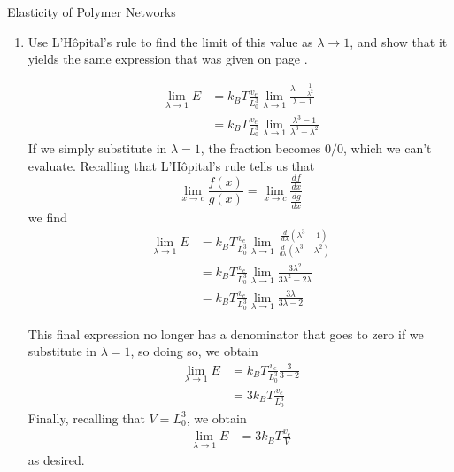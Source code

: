 \begin{activity}{Elasticity of Polymer Networks}
\begin{exercises}
\begin{enumerate}
			\item Use L'H\^opital's rule to find the limit of this value as $\lambda \to 1$, and show that it yields the same expression that was given on page \pageref{\labelbase:eqn:youngsmodulus}.
			
				\begin{solution}{}
					\begin{align*}
						\lim_{\lambda\to 1} E &= k_BT\frac{v_e}{L_0^3} \lim_{\lambda\to 1} \frac{\lambda - \frac{1}{\lambda^2}}{\lambda - 1}\\
							&= k_B T\frac{v_e}{L_0^3} \lim_{\lambda\to 1} \frac{\lambda^3 - 1}{\lambda^3 - \lambda^2}
					\end{align*}
					If we simply substitute in $\lambda=1$, the fraction becomes $0/0$, which we can't evaluate.  Recalling that L'H\^opital's rule tells us that
					\begin{equation*}
						\lim_{x\to c} \frac{f(x)}{g(x)} = \lim_{x\to c} \frac{\frac{df}{dx}}{\frac{dg}{dx}}
					\end{equation*}
					we find
					\begin{align*}
						\lim_{\lambda\to 1} E &= k_BT\frac{v_e}{L_0^3} \lim_{\lambda\to 1} \frac{\frac{d}{d\lambda}\left(\lambda^3 - 1\right)}{\frac{d}{d\lambda}\left(\lambda^3 - \lambda^2\right)} \\
							&= k_BT\frac{v_e}{L_0^3} \lim_{\lambda\to 1} \frac{3\lambda^2}{3\lambda^2 - 2\lambda}\\
							&= k_BT\frac{v_e}{L_0^3} \lim_{\lambda\to 1} \frac{3\lambda}{3\lambda - 2}
					\end{align*}
				\end{solution}
				\begin{solution}{}
					This final expression no longer has a denominator that goes to zero if we substitute in $\lambda =1$, so doing so, we obtain
					\begin{align*}
						\lim_{\lambda\to 1} E &= k_BT\frac{v_e}{L_0^3}\frac{3}{3 - 2}\\
							&= 3k_BT\frac{v_e}{L_0^3}
					\end{align*}
					Finally, recalling that $V = L_0^3$, we obtain
					\begin{align*}
						\lim_{\lambda\to 1} E &= 3k_BT\frac{v_e}{V}
					\end{align*}
					as desired.
				\end{solution}
		\end{enumerate}
		
	
\end{exercises}


%
%	


	
\end{activity}